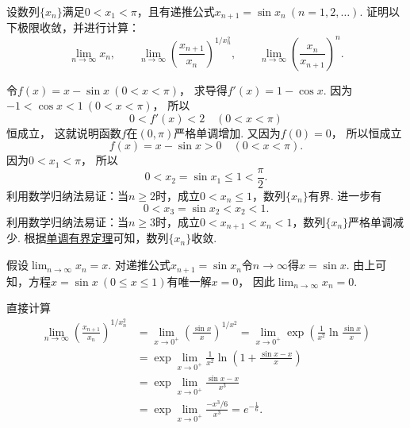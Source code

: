 \begin{example}
设数列\(\{x_n\}\)满足\(0<x_1<\pi\)，且有递推公式\(x_{n+1}=\sin x_n\ (n=1,2,\dotsc)\).
证明以下极限收敛，并进行计算：\begin{equation*}
	\lim_{n\to\infty} x_n,
	\qquad
	\lim_{n\to\infty} \left(\frac{x_{n+1}}{x_n}\right)^{1/x_n^2},
	\qquad
	\lim_{n\to\infty} \left(\frac{x_n}{x_{n+1}}\right)^n.
\end{equation*}
\begin{solution}
令\(f(x) = x - \sin x\ (0<x<\pi)\)，
求导得\(f'(x) = 1 - \cos x\).
因为\(-1 < \cos x < 1\ (0<x<\pi)\)，
所以\begin{equation*}
	0 < f'(x) < 2
	\quad(0<x<\pi)
\end{equation*}
恒成立，
这就说明函数\(f\)在\((0,\pi)\)严格单调增加.
又因为\(f(0) = 0\)，
所以恒成立\begin{equation*}
	f(x) = x - \sin x > 0
	\quad(0<x<\pi).
\end{equation*}
因为\(0<x_1<\pi\)，
所以\begin{equation*}
	0<x_2=\sin x_1\leq1<\frac\pi2.
\end{equation*}
利用数学归纳法易证：当\(n\geq2\)时，成立\(0<x_n\leq1\)，数列\(\{x_n\}\)有界.
进一步有\begin{equation*}
	0<x_3=\sin x_2<x_2<1.
\end{equation*}
利用数学归纳法易证：当\(n\geq3\)时，成立\(0<x_{n+1}<x_n<1\)，数列\(\{x_n\}\)严格单调减少.
根据\hyperref[theorem:极限.数列的单调有界定理]{单调有界定理}可知，数列\(\{x_n\}\)收敛.

假设\(\lim_{n\to\infty} x_n = x\).
对递推公式\(x_{n+1}=\sin x_n\)令\(n\to\infty\)得\(x=\sin x\).
由上可知，方程\(x=\sin x\ (0 \leq x \leq 1)\)有唯一解\(x=0\)，
因此\(\lim_{n\to\infty} x_n = 0\).

直接计算\begin{align*}
	\lim_{n\to\infty} \left(\frac{x_{n+1}}{x_n}\right)^{1/x_n^2}
	&= \lim_{x\to0^+} \left(\frac{\sin x}{x}\right)^{1/x^2}
	= \lim_{x\to0^+} \exp\left(\frac1{x^2}\ln\frac{\sin x}{x}\right) \\
	&= \exp\lim_{x\to0^+} \frac1{x^2} \ln\left(1+\frac{\sin x-x}{x}\right) \\
	&= \exp\lim_{x\to0^+} \frac{\sin x-x}{x^3} \\
	&= \exp\lim_{x\to0^+} \frac{-x^3/6}{x^3}
	= e^{-\frac16}.
\end{align*}


\end{solution}
\end{example}
